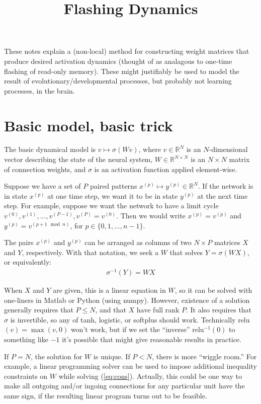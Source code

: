 \documentclass[pdftex,12pt,letterpaper]{article}
\begin{document}
\title{Flashing Dynamics}
\date{}
\maketitle

These notes explain a (non-local) method for constructing weight matrices that produce desired activation dynamics (thought of as analagous to one-time flashing of read-only memory).  These might justifiably be used to model the result of evolutionary/developmental processes, but probably not learning processes, in the brain.

\section{Basic model, basic trick}

The basic dynamical model is $v \mapsto \sigma(Wv)$, where $v\in\mathbb{R}^N$ is an $N$-dimensional vector describing the state of the neural system, $W\in\mathbb{R}^{N\times N}$ is an $N\times N$ matrix of connection weights, and $\sigma$ is an activation function applied element-wise.

Suppose we have a set of $P$ paired patterns $x^{(p)}\mapsto y^{(p)}\in\mathbb{R}^N$.  If the network is in state $x^{(p)}$ at one time step, we want it to be in state $y^{(p)}$ at the next time step.  For example, suppose we want the network to have a limit cycle $v^{(0)}, v^{(1)}, ..., v^{(P-1)}, v^{(P)} = v^{(0)}$.  Then we would write $x^{(p)} = v^{(p)}$ and $y^{(p)} = v^{(p+1 \mod n)}$, for $p\in\{0,1,...,n-1\}$.

The pairs $x^{(p)}$ and $y^{(p)}$ can be arranged as columns of two $N\times P$ matrices $X$ and $Y$, respectively.  With that notation, we seek a $W$ that solves $Y = \sigma(WX)$, or equivalently:
\begin{align}
\sigma^{-1}(Y) = WX\label{eq:cons}
\end{align}

When $X$ and $Y$ are given, this is a linear equation in $W$, so it can be solved with one-liners in Matlab or Python (using numpy).  However, existence of a solution generally requires that $P\leq N$, and that $X$ have full rank $P$.  It also requires that $\sigma$ is invertible, so any of tanh, logistic, or softplus should work.  Technically relu$(v) = \max(v,0)$ won't work, but if we set the ``inverse'' relu$^{-1}(0)$ to something like $-1$ it's possible that might give reasonable results in practice.

If $P=N$, the solution for $W$ is unique.  If $P<N$, there is more ``wiggle room.''  For example, a linear programming solver can be used to impose additional inequality constraints on $W$ while solving (\ref{eq:cons}).  Actually, this could be one way to make all outgoing and/or ingoing connections for any particular unit have the same sign, if the resulting linear program turns out to be feasible.
\end{document}
